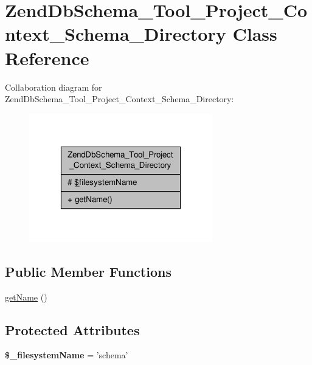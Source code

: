 \hypertarget{classZendDbSchema__Tool__Project__Context__Schema__Directory}{\section{Zend\-Db\-Schema\-\_\-\-Tool\-\_\-\-Project\-\_\-\-Context\-\_\-\-Schema\-\_\-\-Directory Class Reference}
\label{classZendDbSchema__Tool__Project__Context__Schema__Directory}
}


Collaboration diagram for Zend\-Db\-Schema\-\_\-\-Tool\-\_\-\-Project\-\_\-\-Context\-\_\-\-Schema\-\_\-\-Directory\-:\nopagebreak
\begin{figure}[H]
\begin{center}
\leavevmode
\includegraphics[width=226pt]{classZendDbSchema__Tool__Project__Context__Schema__Directory__coll__graph}
\end{center}
\end{figure}
\subsection*{Public Member Functions}
\begin{DoxyCompactItemize}
\item 
\hyperlink{classZendDbSchema__Tool__Project__Context__Schema__Directory_a0e6d584329cdea5f5b3030db5b3432fc}{get\-Name} ()
\end{DoxyCompactItemize}
\subsection*{Protected Attributes}
\begin{DoxyCompactItemize}
\item 
\hypertarget{classZendDbSchema__Tool__Project__Context__Schema__Directory_a21c6a962ff01598da9b0d3f71c517334}{{\bfseries \$\-\_\-filesystem\-Name} = 'schema'}\label{classZendDbSchema__Tool__Project__Context__Schema__Directory_a21c6a962ff01598da9b0d3f71c517334}

\end{DoxyCompactItemize}


